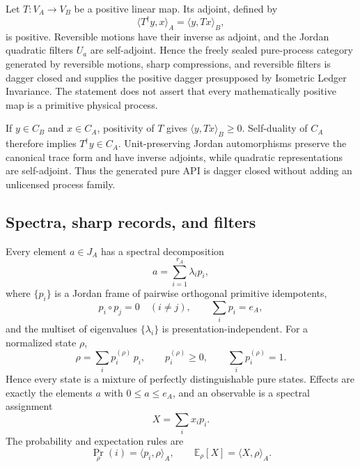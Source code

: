 \begin{corollary}
\label{cor:rd-process-adjoint}
Let $T:V_A\to V_B$ be a positive linear map.  Its adjoint, defined by
\[
 \langle T^\dagger y,x\rangle_A
 =
 \langle y,Tx\rangle_B,
\]
is positive.  Reversible motions have their inverse as adjoint, and the Jordan
quadratic filters $U_a$ are self-adjoint.  Hence the freely sealed pure-process
category generated by reversible motions, sharp compressions, and reversible
filters is dagger closed and supplies the positive dagger presupposed by Isometric
Ledger Invariance.  The statement does not assert that every mathematically positive
map is a primitive physical process.
\end{corollary}

\begin{proofsketch}
If $y\in C_B$ and $x\in C_A$, positivity of $T$ gives
$\langle y,Tx\rangle_B\ge0$.  Self-duality of $C_A$ therefore implies
$T^\dagger y\in C_A$.  Unit-preserving Jordan automorphisms preserve the canonical
trace form and have inverse adjoints, while quadratic representations are
self-adjoint.  Thus the generated pure API is dagger closed without adding an
unlicensed process family.
\end{proofsketch}

\subsection{Spectra, sharp records, and filters}

\begin{theorem}
\label{thm:rd-spectral}
Every element $a\in J_A$ has a spectral decomposition
\[
 a=\sum_{i=1}^{r_A}\lambda_i p_i,
\]
where $\{p_i\}$ is a Jordan frame of pairwise orthogonal primitive idempotents,
\[
 p_i\circ p_j=0\quad(i\ne j),
 \qquad
 \sum_i p_i=e_A,
\]
and the multiset of eigenvalues $\{\lambda_i\}$ is presentation-independent.  For a
normalized state $\rho$,
\[
 \rho=\sum_i p_i^{(\rho)}\,p_i,
 \qquad
 p_i^{(\rho)}\ge0,
 \qquad
 \sum_i p_i^{(\rho)}=1.
\]
Hence every state is a mixture of perfectly distinguishable pure states.  Effects
are exactly the elements $a$ with $0\le a\le e_A$, and an observable is a spectral
assignment
\[
 X=\sum_i x_i p_i.
\]
The probability and expectation rules are
\[
 \Pr_\rho(i)=\langle p_i,\rho\rangle_A,
 \qquad
 \mathbb E_\rho[X]=\langle X,\rho\rangle_A.
\]
\end{theorem}

